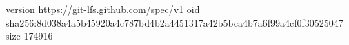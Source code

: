 version https://git-lfs.github.com/spec/v1
oid sha256:8d038a4a5b45920a4c787bd4b2a4451317a42b5bca4b7a6f99a4cf0f30525047
size 174916
